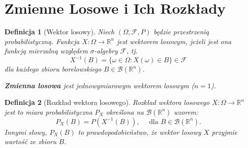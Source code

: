 \documentclass{article}
\newtheorem{Def}{Definicja}
\begin{document}
\section*{Zmienne Losowe i Ich Rozkłady}

\begin{Def}[Wektor losowy]
Niech $(\Omega, \mathcal{F}, P)$ będzie przestrzenią probabilistyczną.
Funkcja $X \colon \Omega \longrightarrow \mathbb{R}^n$ jest wektorem losowym, jeżeli jest ona funkcją mierzalną względem $\sigma$-algebry $\mathcal{F}$, tj.
\[
X^{-1}(B) = \{\omega \in \Omega : X(\omega) \in B\} \in \mathcal{F}
\]
dla każdego zbioru borelowskiego $B \in \mathcal{B}(\mathbb{R}^n)$.
\par\noindent
\textbf{Zmienna losowa} jest jednowymiarowym wektorem losowym ($n=1$).
\end{Def}

\begin{Def}[Rozkład wektora losowego]
Rozkład wektora losowego $X \colon \Omega \longrightarrow \mathbb{R}^n$ jest to miara probabilistyczna $P_X$ określona na $\mathcal{B}(\mathbb{R}^n)$ wzorem:
\[
P_X(B) = P(X^{-1}(B)), \quad \text{ dla } B \in \mathcal{B}(\mathbb{R}^n).
\]
Innymi słowy, $P_X(B)$ to prawdopodobieństwo, że wektor losowy $X$ przyjmie wartość ze zbioru $B$.
\end{Def}
\end{document}
